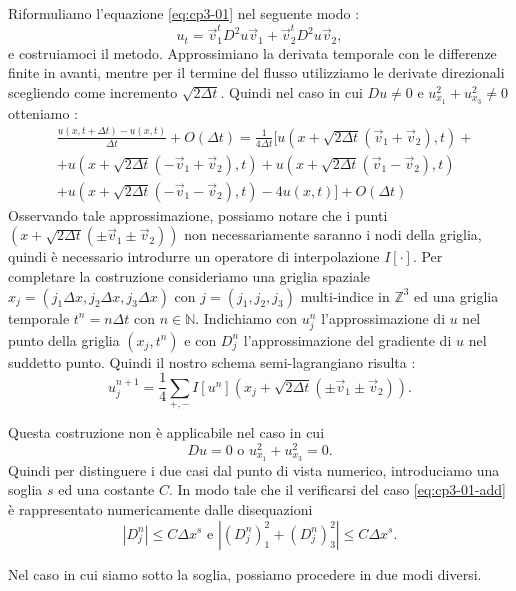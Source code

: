 Riformuliamo l'equazione \eqref{eq:cp3-01} nel seguente modo :
\begin{equation}
u_t=\vec{v}_1^tD^2u\vec{v}_1 + \vec{v}_2^tD^2u\vec{v}_2,
\end{equation}
e costruiamoci il metodo.
Approssimiano la derivata temporale con le differenze finite in avanti, mentre per il termine del flusso utilizziamo le derivate direzionali scegliendo come incremento $\sqrt{2\Delta t}$.
Quindi nel caso in cui $Du \ne 0$ e $u_{x_1}^2+u_{x_3}^2\ne 0$ otteniamo :
\[
\begin{split}
&\frac{u(x,t+\Delta t)-u(x,t)}{\Delta t} +O(\Delta t)= \frac{1}{4\Delta t}\bigl[u(x+\sqrt{2\Delta t}(\vec{v}_1+\vec{v}_2),t) +\\
& +u(x+\sqrt{2\Delta t}(-\vec{v}_1+\vec{v}_2),t) + u(x+\sqrt{2\Delta t}(\vec{v}_1-\vec{v}_2),t) \\
& + u(x+\sqrt{2\Delta t}(-\vec{v}_1-\vec{v}_2),t) - 4u(x,t)\bigr] + O(\Delta t)
\end{split}
\]
Osservando tale approssimazione, possiamo notare che i punti $(x + \sqrt{2\Delta t}(\pm\vec{v}_1 \pm\vec{v}_2))$ non necessariamente saranno i nodi della griglia, quindi è necessario introdurre un operatore di interpolazione $I[\cdot]$.
Per completare la costruzione consideriamo una griglia spaziale $x_j=(j_1\Delta x,j_2\Delta x,j_3\Delta x)$ con $j=(j_1,j_2,j_3)$ multi-indice in $\mathbb{Z}^3$ ed una griglia temporale $t^n=n\Delta t$ con $n\in\mathbb{N}$.
Indichiamo con $u_j^n$ l'approssimazione di $u$ nel punto della griglia $(x_j,t^n)$ e con $D_j^n$ l'approssimazione del gradiente di $u$ nel suddetto punto. Quindi il nostro schema semi-lagrangiano risulta :
\begin{equation}
\label{eq:cp3-02}
u_j^{n+1} = \frac{1}{4}\sum_{+,-}I[u^n](x_j+\sqrt{2\Delta t}(\pm\vec{v}_1\pm\vec{v}_2)).
\end{equation} 
\begin{osservazione}
Questa costruzione non è applicabile nel caso in cui 
\begin{equation}
\label{eq:cp3-01-add}
Du = 0 \text{ o } u_{x_1}^2+u_{x_3}^2 = 0. 
\end{equation}
Quindi per distinguere i due casi dal punto di vista numerico, introduciamo una soglia $s$ ed una costante $C$. In modo tale che il verificarsi del caso \eqref{eq:cp3-01-add} è rappresentato numericamente dalle disequazioni
\[
|D_j^n|\le C\Delta x^s\text{ e }|(D_j^n)_1^2+(D_j^n)_3^2|\le C\Delta x^s.
\]
\end{osservazione}
Nel caso in cui siamo sotto la soglia, possiamo procedere in due modi diversi.
